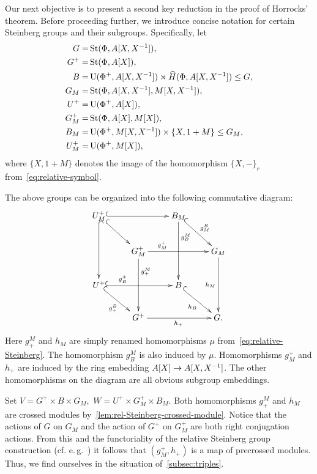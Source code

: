 Our next objective is to present a second key reduction in the proof of Horrocks' theorem.
Before proceeding further, we introduce concise notation for certain Steinberg groups and their subgroups.
Specifically, let
{\allowdisplaybreaks\begin{align*}
    G     =& \operatorname{St}(\Phi, A[X, X^{-1}]),\\
    G^+   =& \operatorname{St}(\Phi, A[X]),\\
    B     =& \operatorname{U}(\Phi^+, A[X, X^{-1}]) \rtimes \widehat{H}(\Phi, A[X, X^{-1}]) \leq G,\\
    G_M   =& \operatorname{St}(\Phi, A[X, X^{-1}], M[X, X^{-1}]),\\
    U^+   =& \operatorname{U}(\Phi^+, A[X]),\\
    G^+_M =& \operatorname{St}(\Phi, A[X], M[X]),\\
    B_M   =& \operatorname{U}(\Phi^+, M[X, X^{-1}]) \times \{X, 1+M\} \leq G_M,\\
    U^+_M =& \operatorname{U}(\Phi^+, M[X]),
\end{align*}}
where $\{X, 1+M\}$ denotes the image of the homomorphism $\{X, -\}_{r}$ from~\eqref{eq:relative-symbol}.

The above groups can be organized into the following commutative diagram:
\begin{equation} \label{eq:cube-Steinberg} \xymatrix{
    U^+_M \ar@{^{(}->}[rr] \ar@{^{(}->}[dd] \ar@{^{(}->}[rd] &                        & B_M \ar[dd]^(.3){g_B^M} \ar@{^{(}->}[rd]^{g^B_M} &           \\
    & G^+_M \ar[rr]^(.3){g^+_M} \ar^(.3){g^M_+}[dd] &                   & G_M \ar[dd]_{h_M} \\
    U^+ \ar@{^{(}->}[rr]^(.3){g_B^+} \ar@{^{(}->}[rd]_{g_+^B}          &                        & B \ar@{^{(}->}[rd]_{h_B}       &           \\
    & G^+ \ar[rr]_{h_+}              &                   & G.}\end{equation}
Here $g^M_+$ and $h_M$ are simply renamed homomorphisms $\mu$ from~\eqref{eq:relative-Steinberg}.
The homomorphism $g^M_B$ is also induced by $\mu$.
Homomorphisms $g_M^+$ and $h_+$ are induced by the ring embedding $A[X] \to A[X, X^{-1}]$.
The other homomorphisms on the diagram are all obvious subgroup embeddings.

Set $V = G^+\times B \times G_M,$ $W = U^+\times G^+_M \times B_M.$
Both homomorphisms $g_+^M$ and $h_M$ are crossed modules by~\cref{lem:rel-Steinberg-crossed-module}.
Notice that the actions of $G$ on $G_M$ and the action of $G^+$ on $G_M^+$ are both right conjugation actions.
From this and the functoriality of the relative Steinberg group construction (cf. e.\,g.~\cite[\S~3]{S15}) it follows that $(g^+_M, h_+)$ is a map of precrossed modules.
Thus, we find ourselves in the situation of~\cref{subsec:triples}.

